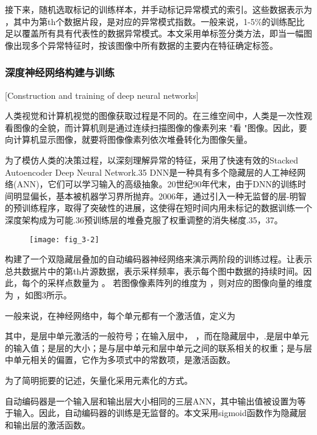 接下来，随机选取标记的训练样本，并手动标记异常模式的索引。这些数据表示为 ，其中为第th个数据片段，是对应的异常模式指数。一般来说，1-5\%的训练配比足以覆盖所有具有代表性的数据异常模式。本文采用单标签分类方法，即当一幅图像出现多个异常特征时，按该图像中所有数据的主要内在特征确定标签。

\subsubsection{深度神经网络构建与训练}[Construction and training of deep neural networks]

人类视觉和计算机视觉的图像获取过程是不同的。在三维空间中，人类是一次性观看图像的全貌，而计算机则是通过连续扫描图像的像素列来 "看 "图像。因此，要向计算机显示图像，就要将图像像素列依次堆叠转化为图像矢量。

为了模仿人类的决策过程，以深刻理解异常的特征，采用了快速有效的Stacked Autoencoder Deep Neural Network.35 DNN是一种具有多个隐藏层的人工神经网络(ANN)，它们可以学习输入的高级抽象。20世纪90年代末，由于DNN的训练时间明显偏长，基本被机器学习界所抛弃。2006年，通过引入一种无监督的层-明智的预训练程序，取得了突破性的进展，这使得在短时间内用未标记的数据训练一个深度架构成为可能.36预训练层的堆叠克服了权重调整的消失梯度.35，37。

\begin{figure}[!h]
\centering\texttt{[image: fig\_3-2]}
\vspace{0.2em}
\end{figure}

构建了一个双隐藏层叠加的自动编码器神经网络来演示两阶段的训练过程。让表示总共数据片中的第th片源数据，表示采样频率，表示每个图中数据的持续时间。因此，每个的采样点数量为 。 若图像像素阵列的维度为 ，则对应的图像向量的维度为 ，如图3所示。

一般来说，在神经网络中，每个单元都有一个激活值，定义为

其中，是层中单元激活的一般符号；在输入层中， ，而在隐藏层中，.是层中单元的输入值；是层的大小；是与层中单元和层中单元之间的联系相关的权重；是与层中单元相关的偏置，它作为多项式中的常数项，是激活函数。

为了简明扼要的记述，矢量化采用元素化的方式。


自动编码器是一个输入层和输出层大小相同的三层ANN，其中输出值被设置为等于输入。因此，自动编码器的训练是无监督的。本文采用sigmoid函数作为隐藏层和输出层的激活函数。



